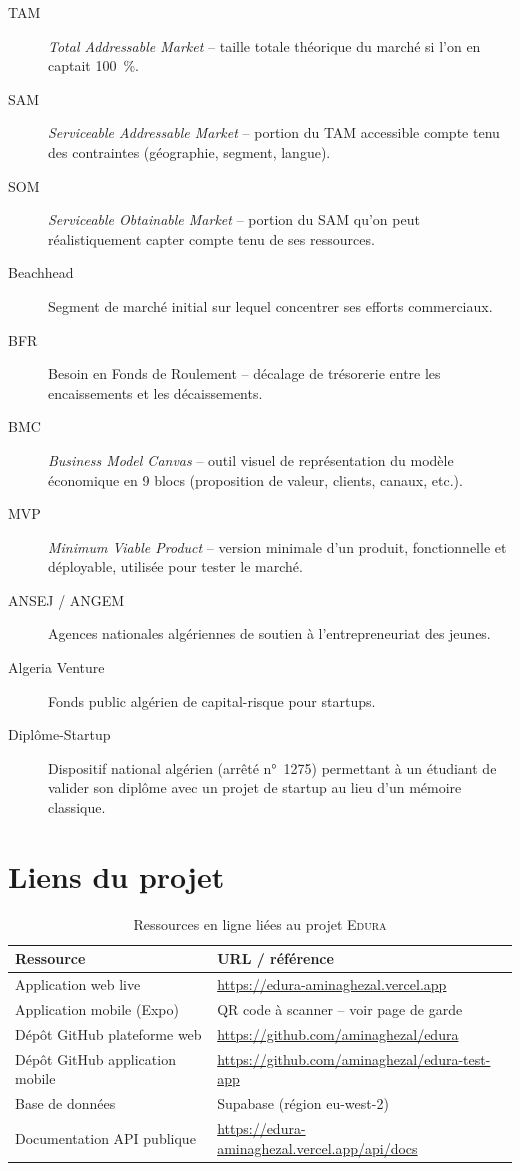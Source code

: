 \documentclass[12pt,a4paper,oneside]{report}
\newcommand{\edura}{\textsc{Edura}}
\begin{document}
\begin{description}
  \item[TAM] \textit{Total Addressable Market} -- taille totale théorique du marché si l'on en captait 100~\%.
  \item[SAM] \textit{Serviceable Addressable Market} -- portion du TAM accessible compte tenu des contraintes (géographie, segment, langue).
  \item[SOM] \textit{Serviceable Obtainable Market} -- portion du SAM qu'on peut réalistiquement capter compte tenu de ses ressources.
  \item[Beachhead] Segment de marché initial sur lequel concentrer ses efforts commerciaux.
  \item[BFR] Besoin en Fonds de Roulement -- décalage de trésorerie entre les encaissements et les décaissements.
  \item[BMC] \textit{Business Model Canvas} -- outil visuel de représentation du modèle économique en 9 blocs (proposition de valeur, clients, canaux, etc.).
  \item[MVP] \textit{Minimum Viable Product} -- version minimale d'un produit, fonctionnelle et déployable, utilisée pour tester le marché.
  \item[ANSEJ / ANGEM] Agences nationales algériennes de soutien à l'entrepreneuriat des jeunes.
  \item[Algeria Venture] Fonds public algérien de capital-risque pour startups.
  \item[Diplôme-Startup] Dispositif national algérien (arrêté n°~1275) permettant à un étudiant de valider son diplôme avec un projet de startup au lieu d'un mémoire classique.
\end{description}

\chapter{Liens du projet}

\begin{table}[H]
\centering
\caption{Ressources en ligne liées au projet \edura{}}
\begin{tabular}{ll}
\toprule
\textbf{Ressource} & \textbf{URL / référence} \\
\midrule
Application web live & \url{https://edura-aminaghezal.vercel.app} \\
Application mobile (Expo) & QR code à scanner -- voir page de garde \\
Dépôt GitHub plateforme web & \url{https://github.com/aminaghezal/edura} \\
Dépôt GitHub application mobile & \url{https://github.com/aminaghezal/edura-test-app} \\
Base de données & Supabase (région eu-west-2) \\
Documentation API publique & \url{https://edura-aminaghezal.vercel.app/api/docs} \\
\bottomrule
\end{tabular}
\end{table}
\end{document}
